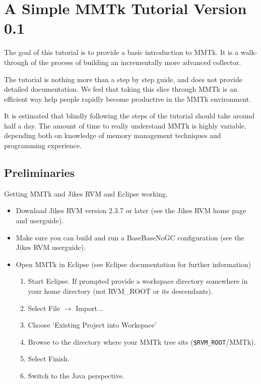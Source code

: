 \documentclass{article}
\newcommand{\env}[1]{\texttt{\$#1}}
\newcommand{\file}[1]{\textsf{#1}}
\newcommand{\menu}[0]{$\rightarrow$}
\begin{document}
\section{A Simple MMTk Tutorial Version 0.1}

The goal of this tutorial is to provide a basic introduction to
MMTk. It is a walk-through of the process of building an
incrementally more advanced collector.

The tutorial is nothing more than a step by step guide, and does not
provide detailed documentation. We feel that taking this slice
through MMTk is an efficient way help people rapidly become
productive in the MMTk environment.

It is estimated that blindly following the steps of the tutorial
should take around half a day. The amount of time to really
understand MMTk is highly variable, depending both on knowledge of
memory management techniques and programming experience.

\subsection{Preliminaries}

Getting MMTk and Jikes RVM and Eclipse working.

\begin{itemize}
\item Download Jikes RVM version 2.3.7 or later (see the Jikes RVM
home page and userguide).

\item Make sure you can build and run a BaseBaseNoGC configuration
(see the Jikes RVM userguide).

\item Open MMTk in Eclipse (see Eclipse documentation for further
information)
\begin{enumerate}
    \item Start Eclipse. If prompted provide a workspace directory
    somewhere in your home directory (not RVM\_ROOT or its
    descendants).
    \item Select File \menu{} Import...
    \item Choose `Existing Project into Workspace'
    \item Browse to the directory where your MMTk tree
    sits (\file{\env{RVM\_ROOT}/MMTk}).
    \item Select Finish.
    \item Switch to the Java perspective.
\end{enumerate}
\end{itemize}
\end{document}
